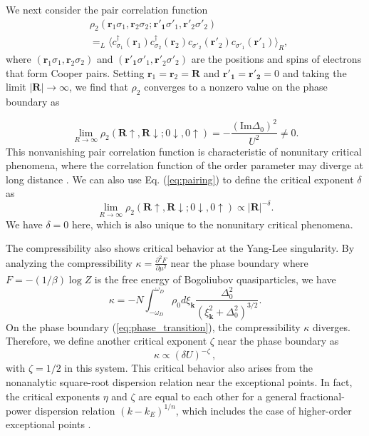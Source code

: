 \documentclass[aps,prl,twocolumn,superscriptaddress]{revtex4-1}
\begin{document}
We next consider the pair correlation function 
\begin{align}
 & \rho_{2}(\bm{r}_{1}\sigma_{1},\bm{r}_{2}\sigma_{2};\bm{r'_{1}}\sigma'_{1},\bm{r'}_{2}\sigma'_{2})\nonumber \\
 & =_{L}\langle c_{\sigma_{1}}^{\dagger}(\bm{r}_{1})c_{\sigma_{2}}^{\dagger}(\bm{r}_{2})c_{\sigma'_{2}}(\bm{r'}_{2})c_{\sigma'_{1}}(\bm{r'}_{1})\rangle_{R},
\end{align}
where $(\bm{r}_{1}\sigma_{1},\bm{r}_{2}\sigma_{2})$ and $(\bm{r'_{1}}\sigma'_{1},\bm{r'}_{2}\sigma'_{2})$
are the positions and spins of electrons that form Cooper pairs.
Setting $\bm{r}_{1}=\bm{r}_{2}=\bm{R}$ and $\bm{r'_{1}}=\bm{r'_2}=0$
and taking the limit $|\bm{R}|\rightarrow\infty$, we find that $\rho_{2}$ converges to a nonzero value
on the phase boundary as

\begin{equation}
\lim_{R\rightarrow\infty}\rho_{2}(\bm{R}\uparrow,\bm{R}\downarrow;0\downarrow,0\uparrow)=-\frac{(\text{Im}\Delta_0)^{2}}{U^{2}}\neq0.\label{eq:pairing}
\end{equation}
This nonvanishing pair correlation function is characteristic of
nonunitary critical phenomena, where the correlation function of the
order parameter may diverge at long distance \cite{Fisher:1978vn}.
We can also use Eq. (\ref{eq:pairing}) to define the critical
exponent $\delta$ as 
\begin{equation}
\lim_{R\rightarrow\infty}\rho_{2}(\bm{R}\uparrow,\bm{R}\downarrow;0\downarrow,0\uparrow)\propto|\bm{R}|^{-\delta}.
\end{equation}
We have $\delta=0$ here, which is also unique to the nonunitary critical
phenomena.

The compressibility also shows critical behavior at the Yang-Lee singularity.
By analyzing the compressibility $\kappa=\frac{\partial^{2}F}{\partial\mu^{2}}$
near the phase boundary where $F=-(1/\beta)\log Z$ is the free energy
of Bogoliubov quasiparticles, we have 
\begin{equation}
\kappa=-N\int_{-\omega_{D}}^{\omega_{D}}\rho_{0}d\xi_{\bm{k}}\frac{\Delta_0^{2}}{(\xi_{\bm{k}}^{2}+\Delta_0^{2})^{3/2}}.
\end{equation}
On the phase boundary (\ref{eq:phase_transition}), the compressibility
$\kappa$ diverges. Therefore, we define another critical exponent
$\zeta$ near the phase boundary as 
\begin{equation}
\kappa\propto(\delta U)^{-\zeta}\,,
\end{equation}
with $\zeta=1/2$ in this system. This critical behavior also arises
from the nonanalytic square-root dispersion relation near the exceptional
points. In fact, the critical exponents $\eta$ and $\zeta$ are equal to each other 
for a general fractional-power dispersion relation $(k-k_{E})^{1/n}$,
which includes the case of higher-order exceptional points \cite{SupplementaryMaterial}. 
\end{document}
